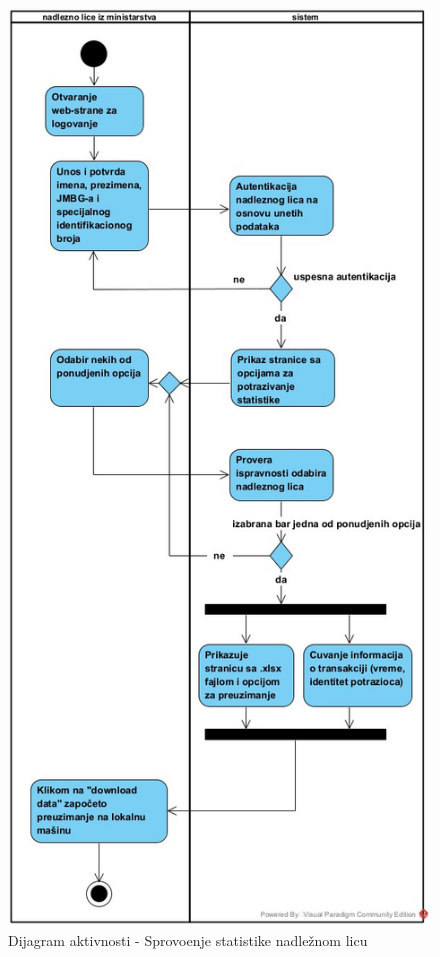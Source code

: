 \documentclass[titlepage]{article}
\begin{document}
\begin{figure}[H]
\includegraphics[scale=0.45]{Sprovodjenje_statistike}
\caption{Dijagram aktivnosti - Sprovo\dj{}enje statistike nadle\v{z}nom licu}
\end{figure}
\end{document}
